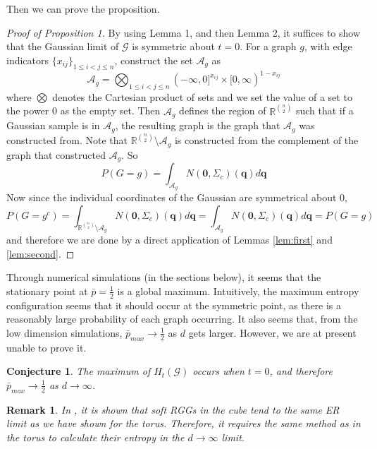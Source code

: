 \documentclass{article}
\newtheorem{conjecture}{Conjecture}
\newtheorem{remark}{Remark}
\newcommand{\tti}{\rightarrow\infty}
\newcommand{\graph}{\mathcal{G}}
\begin{document}
Then we can prove the proposition.
\begin{proof}[Proof of Proposition 1]
    By using Lemma 1, and then Lemma 2, it suffices to show that the Gaussian limit of $\mathcal{G}$ is symmetric about $t=0$. For a graph $g$, with edge indicators $\{x_{ij}\}_{1\leq i<j \leq n}$, construct the set $\mathcal{A}_g$ as
    \begin{equation}
        \mathcal{A}_g = \bigotimes_{1 \leq i < j \leq n} (-\infty, 0]^{x_{ij}}\times[0, \infty)^{1-x_{ij}}
    \end{equation}
    where $\bigotimes$ denotes the Cartesian product of sets and we set the value of a set to the power 0 as the empty set. Then $\mathcal{A}_g$ defines the region of $\mathbb{R}^{\binom{n}{2}}$ such that if a Gaussian sample is in $\mathcal{A}_g$, the resulting graph is the graph that $\mathcal{A}_g$ was constructed from. Note that $\mathbb{R}^{\binom{n}{2}} \setminus \mathcal{A}_g$ is constructed from the complement of the graph that constructed $\mathcal{A}_g$. So
    \begin{equation}
    \label{eq:gaussian_expectation}
        P(G = g) = \int_{\mathcal{A}_g} N(\boldsymbol{0},\Sigma_c)(\boldsymbol{q})d\boldsymbol{q} 
    \end{equation}
    Now since the individual coordinates of the Gaussian are symmetrical about 0,
    \begin{equation}
        P(G = g^c) = \int_{\mathbb{R}^{\binom{n}{2}}\setminus\mathcal{A}_g} N(\boldsymbol{0},\Sigma_c)(\boldsymbol{q})d\boldsymbol{q} = \int_{\mathcal{A}_g} N(\boldsymbol{0},\Sigma_c)(\boldsymbol{q})d\boldsymbol{q} = P(G = g)
    \end{equation}
    and therefore we are done by a direct application of Lemmas \ref{lem:first} and \ref{lem:second}.
\end{proof}
Through numerical simulations (in the sections below), it seems that the stationary point at $\bar{p}=\frac{1}{2}$ is a global maximum. Intuitively, the maximum entropy configuration seems that it should occur at the symmetric point, as there is a reasonably large probability of each graph occurring. It also seems that, from the low dimension simulations, $\bar{p}_{max} \rightarrow \frac{1}{2}$ as $d$ gets larger. However, we are at present unable to prove it.
\begin{conjecture}
    The maximum of $H_t(\graph)$ occurs when $t=0$, and therefore $\bar{p}_{max} \rightarrow \frac{1}{2}$ as $d\tti$.
\end{conjecture}
\begin{remark}
    In \cite{erba2020random}, it is shown that soft RGGs in the cube tend to the same ER limit as we have shown for the torus. Therefore, it requires the same method as in the torus to calculate their entropy in the $d\tti$ limit.
\end{remark}
\end{document}
